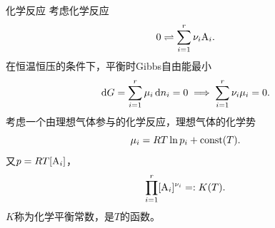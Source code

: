 \begin{example}
	{化学反应}{}
	考虑化学反应
	\[
		0\rightleftharpoons\sum_{i=1}^r\nu_i{\rm A}_i.
	\]
	在恒温恒压的条件下，平衡时Gibbs自由能最小
	\[
		\mathop{}\!\mathrm{d} G=\sum_{i=1}^r\mu_i\mathop{}\!\mathrm{d} n_i=0\implies\sum_{i=1}^r\nu_i\mu_i=0.
	\]
	考虑一个由理想气体参与的化学反应，理想气体的化学势
	\[
		\mu_i=RT\ln p_i+\text{const}(T).
	\]
	又$p=RT[{\rm A}_i]$，%
	\begin{align}
		\prod_{i=1}^r[{\rm A}_i]^{\nu_i}=:K(T).
	\end{align}
	$K$称为化学平衡常数，是$T$的函数。
\end{example}



